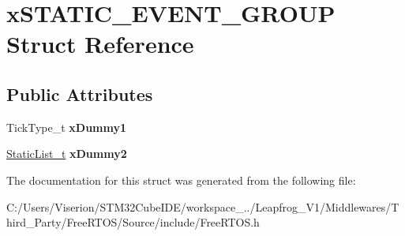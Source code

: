 \hypertarget{structx_s_t_a_t_i_c___e_v_e_n_t___g_r_o_u_p}{}\section{x\+S\+T\+A\+T\+I\+C\+\_\+\+E\+V\+E\+N\+T\+\_\+\+G\+R\+O\+UP Struct Reference}
\label{structx_s_t_a_t_i_c___e_v_e_n_t___g_r_o_u_p}
\subsection*{Public Attributes}
\begin{DoxyCompactItemize}
\item 
\mbox{\label{structx_s_t_a_t_i_c___e_v_e_n_t___g_r_o_u_p_a4ed0094f715dd8f79a354f42fd973fc6}} 
Tick\+Type\+\_\+t {\bfseries x\+Dummy1}
\item 
\mbox{\label{structx_s_t_a_t_i_c___e_v_e_n_t___g_r_o_u_p_a17d070c972ecd0151d7505a539653551}} 
\mbox{\hyperlink{structx_s_t_a_t_i_c___l_i_s_t}{Static\+List\+\_\+t}} {\bfseries x\+Dummy2}
\end{DoxyCompactItemize}


The documentation for this struct was generated from the following file\+:\begin{DoxyCompactItemize}
\item 
C\+:/\+Users/\+Viserion/\+S\+T\+M32\+Cube\+I\+D\+E/workspace\+\_../\+Leapfrog\+\_\+\+V1/\+Middlewares/\+Third\+\_\+\+Party/\+Free\+R\+T\+O\+S/\+Source/include/Free\+R\+T\+O\+S.\+h\end{DoxyCompactItemize}
